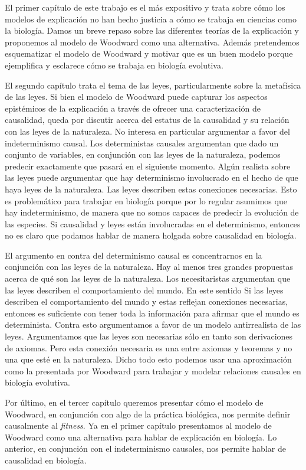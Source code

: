 El primer capítulo de este trabajo es el más expositivo y trata sobre cómo los modelos de explicación no han hecho justicia a cómo se trabaja en ciencias como la biología. Damos un breve repaso sobre las diferentes teorías de la explicación y proponemos al modelo de Woodward como una alternativa. Además pretendemos esquematizar el modelo de Woodward y motivar que es un buen modelo porque ejemplifica y esclarece cómo se trabaja en biología evolutiva.

El segundo capítulo trata el tema de las leyes, particularmente sobre la metafísica de las leyes. Si bien el modelo de Woodward puede capturar los aspectos epistémicos de la explicación a través de ofrecer una caracterización de causalidad, queda por discutir acerca del estatus de la causalidad y su relación con las leyes de la naturaleza. No interesa en particular argumentar a favor del indeterminismo causal. Los deterministas causales argumentan que dado un conjunto de variables, en conjunción con las leyes de la naturaleza, podemos predecir exactamente que pasará en el siguiente momento. Algún realista sobre las leyes puede argumentar que hay determinismo involucrado en el hecho de que haya leyes de la naturaleza. Las leyes describen estas conexiones necesarias. Esto es problemático para trabajar en biología porque por lo regular asumimos que hay indeterminismo, de manera que no somos capaces de predecir la evolución de las especies. Si causalidad y leyes están involucradas en el determinismo, entonces no es claro que podamos hablar de manera holgada sobre causalidad en biología.

El argumento en contra del determinismo causal es concentrarnos en la conjunción con las leyes de la naturaleza. Hay al menos tres grandes propuestas acerca de qué son las leyes de la naturaleza. Los necesitaristas argumentan que las leyes describen el comportamiento del mundo. En este sentido Si las leyes describen el comportamiento del mundo y estas reflejan conexiones necesarias, entonces es suficiente con tener toda la información para afirmar que el mundo es determinista. Contra esto argumentamos a favor de un modelo antirrealista de las leyes. Argumentamos que las leyes son necesarias sólo en tanto son derivaciones de axiomas. Pero esta conexión necesaria es una entre axiomas y teoremas y no una que esté en la naturaleza. Dicho todo esto podemos usar una aproximación como la presentada por Woodward para trabajar y modelar relaciones causales en biología evolutiva.

Por último, en el tercer capítulo queremos presentar cómo el modelo de Woodward, en conjunción con algo de la práctica biológica, nos permite definir causalmente al \emph{fitness}. Ya en el primer capítulo presentamos al modelo de Woodward como una alternativa para hablar de explicación en biología. Lo anterior, en conjunción con el indeterminismo causales, nos permite hablar de causalidad en biología.

